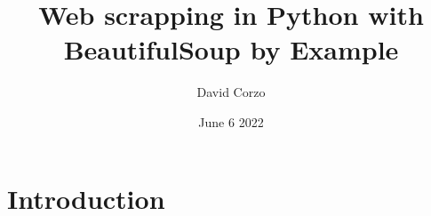 \documentclass[openany]{book}
\title{Web scrapping in Python with BeautifulSoup by Example}
\date{June 6 2022}
\author{David Corzo}
\begin{document}
\maketitle
\tableofcontents

\chapter{Introduction}



\end{document}
